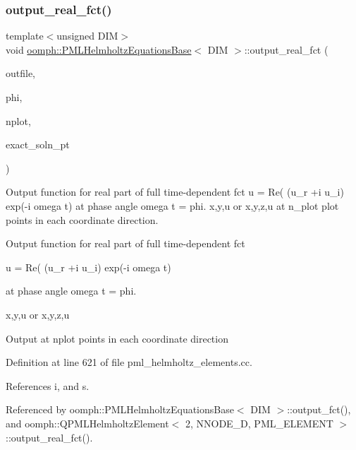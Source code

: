 \subsubsection{\texorpdfstring{output\+\_\+real\+\_\+fct()}{output\_real\_fct()}}
{\footnotesize\ttfamily template$<$unsigned D\+IM$>$ \\
void \hyperlink{classoomph_1_1PMLHelmholtzEquationsBase}{oomph\+::\+P\+M\+L\+Helmholtz\+Equations\+Base}$<$ D\+IM $>$\+::output\+\_\+real\+\_\+fct (\begin{DoxyParamCaption}\item[{std\+::ostream \&}]{outfile,  }\item[{const double \&}]{phi,  }\item[{const unsigned \&}]{nplot,  }\item[{\hyperlink{classoomph_1_1FiniteElement_a690fd33af26cc3e84f39bba6d5a85202}{Finite\+Element\+::\+Steady\+Exact\+Solution\+Fct\+Pt}}]{exact\+\_\+soln\+\_\+pt }\end{DoxyParamCaption})}



Output function for real part of full time-\/dependent fct u = Re( (u\+\_\+r +i u\+\_\+i) exp(-\/i omega t) at phase angle omega t = phi. x,y,u or x,y,z,u at n\+\_\+plot plot points in each coordinate direction. 

Output function for real part of full time-\/dependent fct

u = Re( (u\+\_\+r +i u\+\_\+i) exp(-\/i omega t)

at phase angle omega t = phi.

x,y,u or x,y,z,u

Output at nplot points in each coordinate direction 

Definition at line 621 of file pml\+\_\+helmholtz\+\_\+elements.\+cc.



References i, and s.



Referenced by oomph\+::\+P\+M\+L\+Helmholtz\+Equations\+Base$<$ D\+I\+M $>$\+::output\+\_\+fct(), and oomph\+::\+Q\+P\+M\+L\+Helmholtz\+Element$<$ 2, N\+N\+O\+D\+E\+\_\+D, P\+M\+L\+\_\+\+E\+L\+E\+M\+E\+N\+T $>$\+::output\+\_\+real\+\_\+fct().

\mbox{\label{classoomph_1_1PMLHelmholtzEquationsBase_a1a5c423fc22940d1edb8c623266421de}} 
